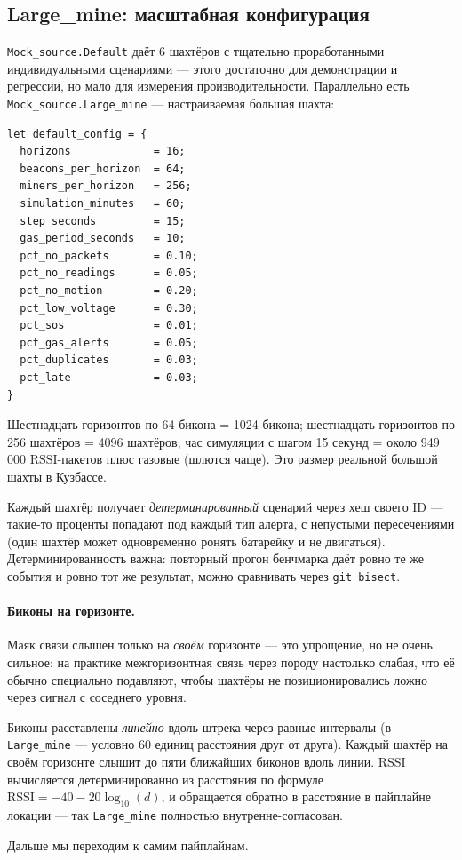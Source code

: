 \subsection{Large\_mine: масштабная конфигурация}

\texttt{Mock\_source.Default} даёт 6 шахтёров с тщательно
проработанными индивидуальными сценариями --- этого достаточно для
демонстрации и регрессии, но мало для измерения производительности.
Параллельно есть \texttt{Mock\_source.Large\_mine} --- настраиваемая
большая шахта:

\begin{lstlisting}
let default_config = {
  horizons             = 16;
  beacons_per_horizon  = 64;
  miners_per_horizon   = 256;
  simulation_minutes   = 60;
  step_seconds         = 15;
  gas_period_seconds   = 10;
  pct_no_packets       = 0.10;
  pct_no_readings      = 0.05;
  pct_no_motion        = 0.20;
  pct_low_voltage      = 0.30;
  pct_sos              = 0.01;
  pct_gas_alerts       = 0.05;
  pct_duplicates       = 0.03;
  pct_late             = 0.03;
}
\end{lstlisting}

Шестнадцать горизонтов по 64 бикона = 1024 бикона; шестнадцать
горизонтов по 256 шахтёров = 4096 шахтёров; час симуляции с шагом 15
секунд = около 949\,000 RSSI-пакетов плюс газовые (шлются чаще). Это
размер реальной большой шахты в Кузбассе.

Каждый шахтёр получает \emph{детерминированный} сценарий через хеш
своего ID --- такие-то проценты попадают под каждый тип алерта, с
непустыми пересечениями (один шахтёр может одновременно ронять
батарейку и не двигаться). Детерминированность важна: повторный
прогон бенчмарка даёт ровно те же события и ровно тот же результат,
можно сравнивать через \texttt{git bisect}.

\paragraph{Биконы на горизонте.} Маяк связи слышен только на
\emph{своём} горизонте --- это упрощение, но не очень сильное: на
практике межгоризонтная связь через породу настолько слабая, что её
обычно специально подавляют, чтобы шахтёры не позиционировались
ложно через сигнал с соседнего уровня.

Биконы расставлены \emph{линейно} вдоль штрека через равные
интервалы (в \texttt{Large\_mine} --- условно 60 единиц расстояния
друг от друга). Каждый шахтёр на своём горизонте слышит до пяти
ближайших биконов вдоль линии. RSSI вычисляется детерминированно из
расстояния по формуле $\text{RSSI} = -40 - 20\log_{10}(d)$, и
обращается обратно в расстояние в пайплайне локации --- так
\texttt{Large\_mine} полностью внутренне-согласован.

Дальше мы переходим к самим пайплайнам.
